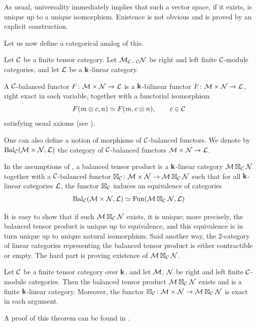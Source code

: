 As usual, universality immediately implies that such a vector space, if it
exists, is unique up to a unique isomorphism. Existence is not obvious and is
proved by an explicit construction.

Let us now define a categorical analog of this.

\begin{definition}\label{d:balanced}
  Let $\mathcal{C}$ be a finite tensor category. Let
  $\mathcal{M}_{\mathcal{C}}$, ${}_{\mathcal{C}} \mathcal{N}$ be right and left finite $\mathcal{C}$-module
  categories, and let $\mathcal{L}$ be a $\mathbf{k}$-linear category.

  A $\mathcal{C}$-balanced functor $F\colon \mathcal{M}\times \mathcal{N}\to \mathcal{L}$ is a
  $\mathbf{k}$-bilinear functor $F\colon \mathcal{M}\times \mathcal{N}\to \mathcal{L}$, right exact in
  each variable, together with a functorial isomorphism
  $$
    F(m\otimes c, n)\simeq F(m, c\otimes n), \qquad c\in \mathcal{C}
  $$
  satisfying usual axioms (see \cite[Definition 3.1]{dsps-balanced}).
\end{definition}

One can also define a notion of morphisms of $\mathcal{C}$-balanced functors. We
denote by $\operatorname{Bal}_{\mathcal{C}}(\mathcal{M}\times \mathcal{N}, \mathcal{L})$ the category of
$\mathcal{C}$-balanced functors $\mathcal{M}\times \mathcal{N}\to \mathcal{L}$.

\begin{definition}\label{d:deligne-balanced}
  In the assumptions of , a balanced tensor product is a
  $\mathbf{k}$-linear category $\mathcal{M}\boxtimes_{\mathcal{C}} \mathcal{N}$ together with a
  $\mathcal{C}$-balanced functor $\boxtimes_{\mathcal{C}}\colon \mathcal{M}\times \mathcal{N}\to \mathcal{M}
  \boxtimes_{\mathcal{C}} \mathcal{N}$ such that for all $\mathbf{k}$-linear categories
  $\mathcal{L}$, the functor $\boxtimes_{\mathcal{C}}$
  induces an equivalence of categories
  $$
    \operatorname{Bal}_{\mathcal{C}}(\mathcal{M}\times \mathcal{N}, \mathcal{L})\simeq
    \operatorname{Fun}(\mathcal{M}\boxtimes_{\mathcal{C}} \mathcal{N}, \mathcal{L})
  $$
\end{definition}
It is easy to show that if such $\mathcal{M}\boxtimes_{\mathcal{C}} \mathcal{N}$ exists, it is
unique; more precisely, the balanced tensor product is unique up to equivalence,
and this equivalence is in turn unique up to unique natural isomorphism. Said
another way, the 2-category of linear categories representing the balanced
tensor product is either contractible or empty. The hard part is proving
existence of $\mathcal{M}\boxtimes_{\mathcal{C}} \mathcal{N}$.

\begin{theorem}\label{t:deligne-balanced}
  Let $\mathcal{C}$ be a finite tensor category over $\mathbf{k}$, and let $\mathcal{M}$, $\mathcal{N}$
  be right and left finite $\mathcal{C}$-module categories. Then the balanced tensor
  product $\mathcal{M}\boxtimes_{\mathcal{C}}\mathcal{N}$ exists and is a finite $\mathbf{k}$-linear
  category. Moreover, the functor $\boxtimes_{\mathcal{C}}\colon \mathcal{M}\times\mathcal{N}\to
  \mathcal{M}\boxtimes_{\mathcal{C}}\mathcal{N}$ is exact in each argument.
\end{theorem}
A proof of this theorem can be found in \cite[Theorem~3.3]{dsps-balanced}.

